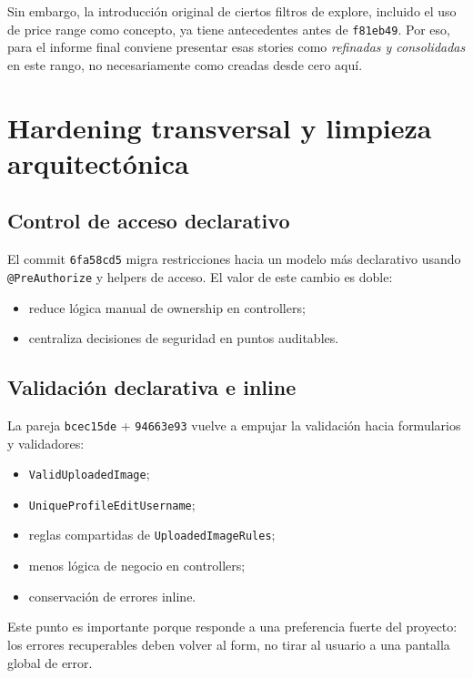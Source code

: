 \documentclass[11pt,a4paper]{report}
\newcommand{\commit}[1]{\texttt{#1}}
\newcommand{\code}[1]{\nolinkurl{#1}}
\begin{document}
Sin embargo, la introducci\'on original de ciertos filtros de explore, incluido el uso de price range como concepto, ya tiene antecedentes antes de \commit{f81eb49}. Por eso, para el informe final conviene presentar esas stories como \emph{refinadas y consolidadas} en este rango, no necesariamente como creadas desde cero aqu\'i.

\chapter{Hardening transversal y limpieza arquitect\'onica}

\section{Control de acceso declarativo}

El commit \commit{6fa58cd5} migra restricciones hacia un modelo m\'as declarativo usando \code{@PreAuthorize} y helpers de acceso. El valor de este cambio es doble:

\begin{itemize}
  \item reduce l\'ogica manual de ownership en controllers;
  \item centraliza decisiones de seguridad en puntos auditables.
\end{itemize}

\section{Validaci\'on declarativa e inline}

La pareja \commit{bcec15de} + \commit{94663e93} vuelve a empujar la validaci\'on hacia formularios y validadores:

\begin{itemize}
  \item \code{ValidUploadedImage};
  \item \code{UniqueProfileEditUsername};
  \item reglas compartidas de \code{UploadedImageRules};
  \item menos l\'ogica de negocio en controllers;
  \item conservaci\'on de errores inline.
\end{itemize}

Este punto es importante porque responde a una preferencia fuerte del proyecto: los errores recuperables deben volver al form, no tirar al usuario a una pantalla global de error.
\end{document}
